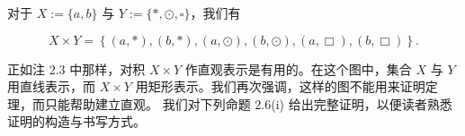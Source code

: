 \begin{examplenote}

\begin{items}
\item

对于 $X := \{a, b\}$ 与 $Y := \{*, \odot, \square\}$，我们有

\[
X\times Y=\left\{(a,*),(b,*),(a,\odot),(b,\odot),(a,\Box),(b,\Box)\right\}.
\]
\item

正如注 2.3 中那样，对积 $ X \times Y $ 作直观表示是有用的。在这个图中，集合 $X$ 与 $Y$ 用直线表示，而 $ X \times Y $ 用矩形表示。我们再次强调，这样的图不能用来证明定理，而只能帮助建立直观。
我们对下列命题 2.6(i) 给出完整证明，以便读者熟悉证明的构造与书写方式。

\end{items}

\end{examplenote}

